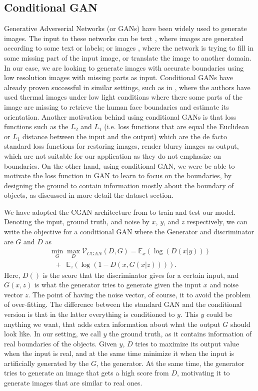 \subsection{Conditional GAN} \label{cGAN}
Generative Adverserial Networks (or GANs) \cite{GAN} have been widely used to generate images. The input to these networks can be text \cite{text2pix, text2pix2}, where images are generated according to some text or labels; or images \cite{pix2pix, cGANberkeley, TV-GAN, deraning}, where the network is trying to fill in some missing part of the input image, or translate the image to another domain. In our case, we are looking to generate images with accurate boundaries using low resolution images with missing parts as input. Conditional GANs have already proven successful in similar settings, such as in \cite{hams, TV-GAN}, where the authors have used thermal images under low light conditions where there some parts of the image are missing to retrieve the human face boundaries and estimate its orientation. Another motivation behind using conditional GANs is that loss functions such as the $L_2$ and $L_1$ (i.e. loss functions that are equal the Euclidean or $L_1$ distance between the input and the output) which are the de facto standard loss functions for restoring images, render blurry images as output, which are not suitable for our application as they do not emphasize on boundaries. On the other hand, using conditional GAN, we were be able to motivate the loss function in GAN to learn to focus on the boundaries, by designing the ground to contain information mostly about the boundary of objects, as discussed in more detail the dataset section.

We have adopted the CGAN architecture from \cite{pix2pix} to train and test our model. Denoting the input, ground truth, and noise by $x$, $y$, and $z$ respectively, we can write the objective for a conditional GAN where the Generator and discriminator are $G$ and $D$ as
\begin{equation}
\begin{array}{l}
\min_G \max_D \mathcal{V}_{CGAN}(D,G) = \mathbb{E}_{x}(\log(D(x|y)))\\
\, \, \, \,+ \, \, \, \mathbb{E}_{z}(\log(1-D(x,G(x|z)))).
\end{array}
\end{equation}
Here, $D()$ is the score that the discriminator gives for a certain input, and $G(x,z)$ is what the generator tries to generate given the input $x$ and noise vector $z$. The point of having the noise vector, of course, it to avoid the problem of over-fitting. The difference between the standard GAN and the conditional version is that in the latter everything is conditioned to $y$. This $y$ could be anything we want, that adds extra information about what the output $G$ should look like. In our setting, we call $y$ the ground truth, as it contains information of real boundaries of the objects. Given $y$, $D$ tries to maximize its output value when the input is real, and at the same time minimize it when the input is artificially generated by the $G$, the generator. At the same time, the generator tries to generate an image that gets a high score from $D$, motivating it to generate images that are similar to real ones.

